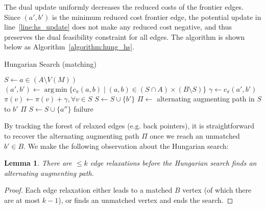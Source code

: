 \documentclass[11pt]{article}
\DeclareMathOperator*{\argmin}{arg\,min}
\theoremstyle{plain}
\newtheorem{lemma}{Lemma}
\begin{document}
The dual update uniformly decreases the reduced costs of the frontier edges.
Since $(a', b')$ is the minimum reduced cost frontier edge, the potential 
update in line~\ref{line:hs_update} does not make any reduced cost negative, 
and thus preserves the dual feasibility constraint for all edges.
The algorithm is shown below as Algorithm~\ref{algorithm:hung_hs}.

\begin{algorithm}
\caption{Hungarian Search (matching)}
\label{algorithm:hung_hs}
\begin{algorithmic}[1]
\Statex %
	\State $S \gets a \in (A \setminus V(M))$
	\Repeat
		\State $(a', b') \gets \argmin\{c_\pi(a, b) \mid (a, b) \in (S \cap A) \times (B \setminus S)\}$
		\State $\gamma \gets c_\pi(a', b')$
		\State $\pi(v) \gets \pi(v) + \gamma, \forall v \in S$
			\label{line:hs_update}
		\State $S \gets S \cup \{b'\}$
		\Statex %
		 
			\State $\Pi \gets$ alternating augmenting path in $S$ to $b'$
			\State\Return $\Pi$
		\Else {}
			\State $S \gets S \cup \{a''\}$
		\EndIf
	\State\Return failure
\EndFunction
\end{algorithmic}
\end{algorithm}

By tracking the forest of relaxed edges (e.g. back pointers), it is 
straightforward to recover the alternating augmenting path $\Pi$ once we reach 
an unmatched $b' \in B$.
We make the following observation about the Hungarian search:

\begin{lemma}
\label{lemma:hungsearch_length}
	There are $\leq k$ edge relaxations before the Hungarian search finds 
	an alternating augmenting path.
\end{lemma}
\begin{proof}
	Each edge relaxation either leads to a matched $B$ vertex (of which 
	there are at most $k-1$), or finds an unmatched vertex and ends the 
	search.
\end{proof}
\end{document}
